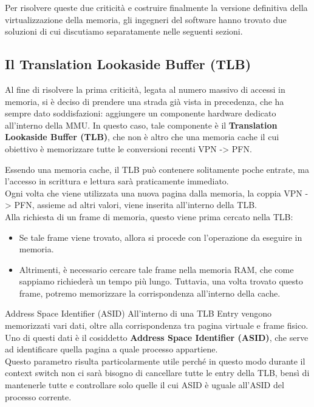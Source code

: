 \documentclass[12pt]{report}
\begin{document}
	Per risolvere queste due criticità e costruire finalmente la versione definitiva della virtualizzazione della memoria, gli ingegneri del software hanno trovato due soluzioni di cui discutiamo separatamente nelle seguenti sezioni.
	
	\subsection{Il Translation Lookaside Buffer (TLB)}
	Al fine di risolvere la prima criticità, legata al numero massivo di accessi in memoria, si è deciso di prendere una strada già vista in precedenza, che ha sempre dato soddisfazioni: aggiungere un componente hardware dedicato all'interno della MMU. In questo caso, tale componente è il \textbf{Translation Lookaside Buffer (TLB)}, che non è altro che una memoria cache il cui obiettivo è memorizzare tutte le conversioni recenti VPN -> PFN.
	\smallbreak
	
	Essendo una memoria cache, il TLB può contenere solitamente poche entrate, ma l'accesso in scrittura e lettura sarà praticamente immediato.\\
	Ogni volta che viene utilizzata una nuova pagina dalla memoria, la coppia VPN -> PFN, assieme ad altri valori, viene inserita all'interno della TLB.\\
	Alla richiesta di un frame di memoria, questo viene prima cercato nella TLB:
	\begin{itemize}
		\item Se tale frame viene trovato, allora si procede con l'operazione da eseguire in memoria.
		
		\item Altrimenti, è necessario cercare tale frame nella memoria RAM, che come sappiamo richiederà un tempo più lungo. Tuttavia, una volta trovato questo frame, potremo memorizzare la corrispondenza all'interno della cache.
	\end{itemize}
	\begin{proposizione}{Address Space Identifier (ASID)}{}
		All'interno di una TLB Entry vengono memorizzati vari dati, oltre alla corrispondenza tra pagina virtuale e frame fisico. Uno di questi dati è il cosiddetto \textbf{Address Space Identifier (ASID)}, che serve ad identificare quella pagina a quale processo appartiene.\\
		Questo parametro risulta particolarmente utile perché in questo modo durante il context switch non ci sarà bisogno di cancellare tutte le entry della TLB, bensì di mantenerle tutte e controllare solo quelle il cui ASID è uguale all'ASID del processo corrente.
	\end{proposizione}
	
\end{document}
